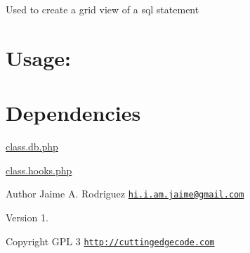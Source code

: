 Used to create a grid view of a sql statement\hypertarget{nav1_usage}{}\section{Usage\-:}\label{nav1_usage}

\hypertarget{ip2country_dependencies}{}\section{Dependencies}\label{ip2country_dependencies}

\begin{DoxyItemize}
\item \hyperlink{class_8db_8php}{class.\-db.\-php}
\item \hyperlink{class_8hooks_8php}{class.\-hooks.\-php}
\end{DoxyItemize}

\begin{DoxyAuthor}{Author}
Jaime A. Rodriguez \href{mailto:hi.i.am.jaime@gmail.com}{\tt hi.\-i.\-am.\-jaime@gmail.\-com} 
\end{DoxyAuthor}
\begin{DoxyVersion}{Version}
1. 
\end{DoxyVersion}
\begin{DoxyCopyright}{Copyright}
G\-P\-L 3 \href{http://cuttingedgecode.com}{\tt http\-://cuttingedgecode.\-com} 
\end{DoxyCopyright}
